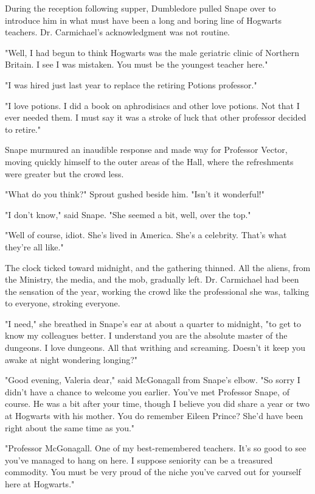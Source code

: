 During the reception following supper, Dumbledore pulled Snape over to introduce him in what must have been a long and boring line of Hogwarts teachers. Dr. Carmichael's acknowledgment was not routine.

"Well, I had begun to think Hogwarts was the male geriatric clinic of Northern Britain. I see I was mistaken. You must be the youngest teacher here."

"I was hired just last year to replace the retiring Potions professor."

"I love potions. I did a book on aphrodisiacs and other love potions. Not that I ever needed them. I must say it was a stroke of luck that other professor decided to retire."

Snape murmured an inaudible response and made way for Professor Vector, moving quickly himself to the outer areas of the Hall, where the refreshments were greater but the crowd less.

"What do you think?" Sprout gushed beside him. "Isn't it wonderful!"

"I don't know," said Snape. "She seemed a bit, well, over the top."

"Well of course, idiot. She's lived in America. She's a celebrity. That's what they're all like."

The clock ticked toward midnight, and the gathering thinned. All the aliens, from the Ministry, the media, and the mob, gradually left. Dr. Carmichael had been the sensation of the year, working the crowd like the professional she was, talking to everyone, stroking everyone.

"I need," she breathed in Snape's ear at about a quarter to midnight, "to get to know my colleagues better. I understand you are the absolute master of the dungeons. I love dungeons. All that writhing and screaming. Doesn't it keep you awake at night{\el} wondering{\el} longing{\el}?"

"Good evening, Valeria dear," said McGonagall from Snape's elbow. "So sorry I didn't have a chance to welcome you earlier. You've met Professor Snape, of course. He was a bit after your time, though I believe you did share a year or two at Hogwarts with his mother. You do remember Eileen Prince? She'd have been right about the same time as you."

"Professor McGonagall. One of my best-remembered teachers. It's so good to see you've managed to hang on here. I suppose seniority can be a treasured commodity. You must be very proud of the niche you've carved out for yourself here at Hogwarts."

